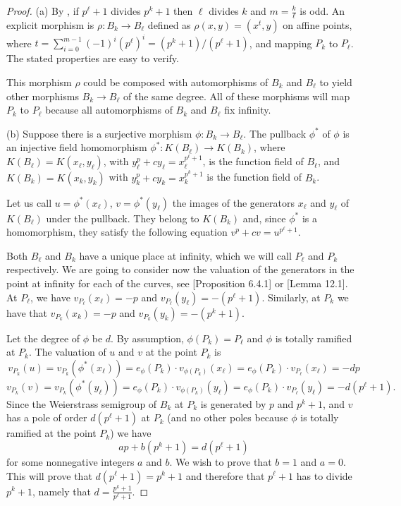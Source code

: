 \documentclass[oneside,a4paper,12pt]{article}
\theoremstyle{plain} %
\theoremstyle{definition} %
\begin{document}
\begin{proof}
     (a)
    By , if $p^\ell +1$  divides $p^k+1$
then $\ell$ divides $k$ and     $m=\frac{k}{\ell}$ is odd.
    An explicit morphism is $\rho:B_{k} \longrightarrow B_{\ell}$ defined as
$  \rho (x,y) = \left(x^{t}, y \right)$ on affine points, where 
    $t=\sum_{i=0}^{m-1} (-1)^i(p^{\ell})^i=(p^k+1)/(p^\ell +1)$,
    and mapping $P_k$ to $P_\ell$.
    The stated properties are easy to verify.

    This morphism $\rho$ could be composed with automorphisms of $B_k$ and $B_\ell$
    to yield other morphisms $ B_{k} \longrightarrow B_{\ell}$ of the same degree.
All of these morphisms will map $P_k$ to $P_\ell$ because all automorphisms of
$B_k$ and $B_\ell$ fix infinity.


    (b)
    Suppose there is a surjective  morphism $\phi: B_{k} \longrightarrow B_\ell$.
    The pullback $\phi^*$ of $\phi$ is an injective  field homomorphism $\phi^*: K(B_\ell) \longrightarrow K(B_k)$, where $ K(B_\ell)=K(x_\ell,y_\ell)$, with $y_\ell^p+c y_\ell=x_\ell^{p^\ell+1}$, 
    is the function field of $B_\ell$,
    and  $K(B_{k})=K(x_k,y_k)$ with $y_k^p+c y_k=x_k^{p^{k} +1}$ is the function field of  $B_k$.

    Let us call $u=\phi^*(x_\ell)$, $v=\phi^*(y_\ell)$ the images of the generators $x_\ell$ and $y_\ell$ of $K(B_\ell)$ under the pullback. They belong to $K(B_k)$ and, since $\phi^*$ is a homomorphism, they satisfy the following equation $v^p+c v=u^{p^\ell+1}$.


    Both $B_\ell$ and $B_{k}$ have a unique place at infinity, which we will call $P_{\ell}$ and $P_{k}$ respectively. We are going to consider now the valuation of the generators in the point at infinity for each of the curves, see \cite{Stichtenoth1973B}[Proposition 6.4.1] or \cite{HKT}[Lemma 12.1]. 
    At $P_{\ell}$, we have $v_{P_{\ell}}(x_\ell)=-p$ and $v_{P_{\ell}}(y_\ell)=-(p^\ell+1)$. Similarly, at $P_{k}$ we have that $v_{P_{k}}(x_k)=-p$ and $v_{P_{k}}(y_k)=-(p^{k}+1)$.

    Let the degree of $\phi$ be $d$. By assumption, 
    $\phi(P_{k})=P_{\ell}$ and
    $\phi$ is totally ramified at $P_{k}$.
    The valuation of $u$ and $v$ at the point $P_{k}$ is
    \[
    v_{P_{k}}(u)=v_{P_{k}}(\phi^*(x_\ell))=e_{\phi}(P_{k}) \cdot v_{\phi(P_{k})}(x_\ell)=e_{\phi}(P_{k}) \cdot v_{P_{\ell}}(x_\ell)=-dp
    \]
    \[
    v_{P_{k}}(v)=v_{P_{k}}(\phi^*(y_\ell))=e_{\phi}(P_{k}) \cdot v_{\phi(P_{k})}(y_\ell)=e_{\phi}(P_{k}) \cdot v_{P_{\ell}}(y_\ell)=-d(p^\ell+1).
    \]
    Since the Weierstrass semigroup of $B_{k}$ at $P_{k}$ is generated by $p$ and $p^{k}+1$, and $v$ has a pole of order $d(p^\ell+1)$ at $P_{k}$ (and no other poles because $\phi$ is totally ramified at the point $P_k$) 
    we have
    \begin{equation}\label{ab_eqn}
    ap+b(p^k+1)=d(p^\ell+1)
    \end{equation}
    for some nonnegative integers $a$ and $b$.
    We wish to prove that $b=1$ and $a=0$.
    This will prove that $d(p^\ell+1)=p^{k}+1$ and therefore
    that $p^\ell+1$ has to divide $p^{k}+1$, namely that $d=\frac{p^k+1}{p^\ell +1}$.


\end{proof}
\end{document}
